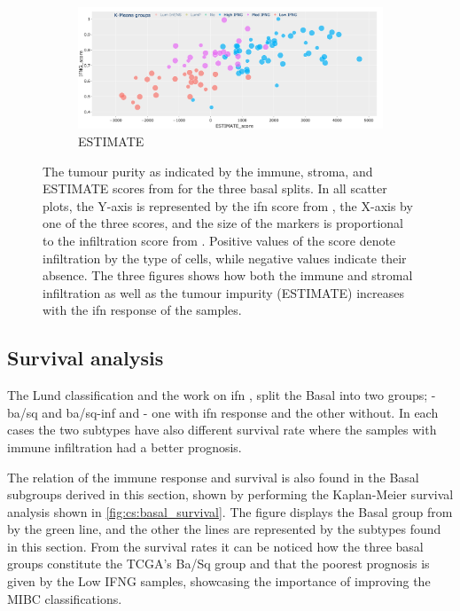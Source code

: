 \begin{figure}[H]
    \centering
    \begin{subfigure}[!t]{0.89\textwidth}
        \includegraphics[width=\textwidth,keepaspectratio]{Sections/ClusteringAnalysis/Resources/discussion/Estimate_spectrum.png}
        \caption{ESTIMATE}
        \label{fig:cs:estimate_basal}
    \end{subfigure}
    \centering
    \caption[New MIBC subgroups and their tumour purity]{The tumour purity as indicated by the immune, stroma, and ESTIMATE scores from \citet{Yoshihara2013-wq} for the three basal splits. In all scatter plots, the Y-axis is represented by the \acrshort{ifn} score from \citet{Baker2022-bj}, the X-axis by one of the three scores, and the size of the markers is proportional to the infiltration score from \citet{Robertson2017-mg}. Positive values of the score denote infiltration by the type of cells, while negative values indicate their absence. The three figures shows how both the immune and stromal infiltration as well as the tumour impurity (ESTIMATE) increases with the \acrshort{ifn} response of the samples.}
    \label{fig:cs:tumour_purity}
\end{figure}


\subsection{Survival analysis}

The Lund classification \citet{Marzouka2018-ge} and the work on \acrshort{ifn} \citet{Baker2022-bj}, split the Basal into two groups; \citet{Marzouka2018-ge} - \acrfull{ba/sq} and \acrfull{ba/sq-inf} and \citet{Baker2022-bj} - one with \acrshort{ifn} response and the other without. In each cases the two subtypes have also different survival rate where the samples with immune infiltration had a better prognosis.

The relation of the immune response and survival is also found in the Basal subgroups derived in this section, shown by performing the Kaplan-Meier survival analysis shown in \cref{fig:cs:basal_survival}. The figure displays the Basal group from \citet{Robertson2017-mg} by the green line, and the other the lines are represented by the subtypes found in this section. From the survival rates it can be noticed how the three basal groups constitute the TCGA's Ba/Sq group and that the poorest prognosis is given by the Low IFNG samples, showcasing the importance of improving the MIBC classifications. 


